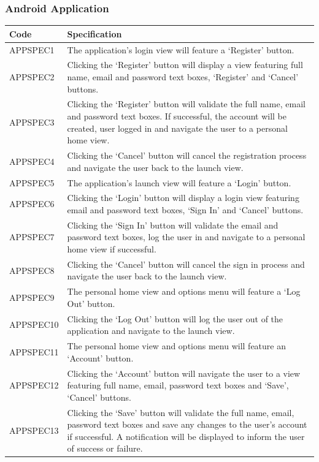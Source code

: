 \documentclass[11pt,a4paper]{article}
\begin{document}
\subsubsection{Android Application}

\begin{longtable}{|p{2.5cm}p{13cm}|}
\hline
\textbf{Code} & \textbf{Specification} \\

\hline
APPSPEC1 & The application's login view will feature a `Register' button. \\ \hline
APPSPEC2 & Clicking the `Register' button will display a view featuring full name, email and password text boxes, `Register' and `Cancel' buttons. \\ \hline
APPSPEC3 & Clicking the `Register' button will validate the full name, email and password text boxes. If successful, the account will be created, user logged in and navigate the user to a personal home view. \\ \hline
APPSPEC4 & Clicking the `Cancel' button will cancel the registration process and navigate the user back to the launch view. \\ \hline
APPSPEC5 & The application's launch view will feature a `Login' button. \\ \hline
APPSPEC6 & Clicking the `Login' button will display a login view featuring email and password text boxes, `Sign In' and `Cancel' buttons. \\ \hline
APPSPEC7 & Clicking the `Sign In' button will validate the email and password text boxes, log the user in and navigate to a personal home view if successful. \\ \hline
APPSPEC8 & Clicking the `Cancel' button will cancel the sign in process and navigate the user back to the launch view. \\ \hline
APPSPEC9 & The personal home view and options menu will feature a `Log Out' button. \\ \hline
APPSPEC10 & Clicking the `Log Out' button will log the user out of the application and navigate to the launch view. \\ \hline
APPSPEC11 & The personal home view and options menu will feature an `Account' button. \\ \hline
APPSPEC12 & Clicking the `Account' button will navigate the user to a view featuring full name, email, password text boxes and `Save', `Cancel' buttons. \\ \hline
APPSPEC13 & Clicking the `Save' button will validate the full name, email, password text boxes and save any changes to the user's account if successful. A notification will be displayed to inform the user of success or failure. \\ \hline

\end{longtable}
\end{document}
